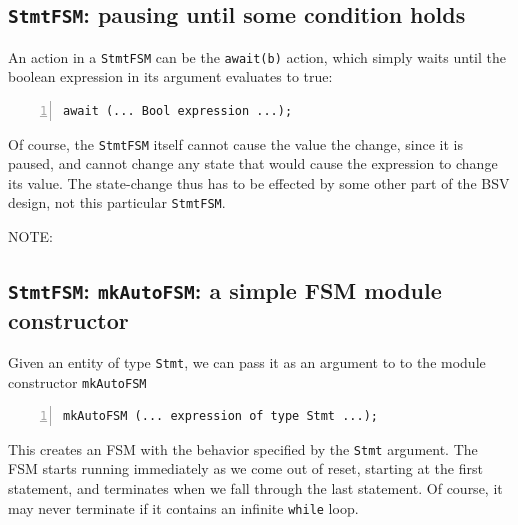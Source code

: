 \subsection{{\tt StmtFSM}: pausing until some condition holds}


An action in a \verb|StmtFSM| can be the \verb|await(b)| action, which
simply waits until the boolean expression in its argument evaluates to
true:

{\small
\begin{Verbatim}[frame=single, numbers=left]
   await (... Bool expression ...);
\end{Verbatim}
}

Of course, the \verb|StmtFSM| itself cannot cause the value the
change, since it is paused, and cannot change any state that would
cause the expression to change its value.  The state-change thus has
to be effected by some other part of the BSV design, not this
particular \verb|StmtFSM|.

\vspace{2ex}


NOTE:


\subsection{{\tt StmtFSM}: {\tt mkAutoFSM}: a simple FSM module constructor}


Given an entity of type \verb|Stmt|, we can pass it as an argument to
to the module constructor \verb|mkAutoFSM|

{\small
\begin{Verbatim}[frame=single, numbers=left]
   mkAutoFSM (... expression of type Stmt ...);
\end{Verbatim}
}

This creates an FSM with the behavior specified by the \verb|Stmt|
argument.  The FSM starts running immediately as we come out of reset,
starting at the first statement, and terminates when we fall through
the last statement.  Of course, it may never terminate if it contains
an infinite {\tt while} loop.


